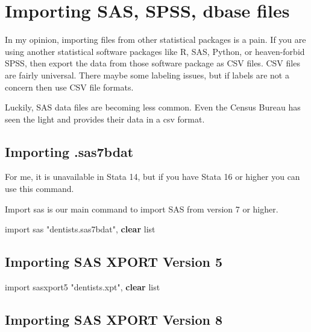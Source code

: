 \documentclass[
]{book}
\newenvironment{Shaded}{\begin{snugshade}}{\end{snugshade}}
\newcommand{\KeywordTok}[1]{\textcolor[rgb]{0.13,0.29,0.53}{\textbf{#1}}}
\newcommand{\NormalTok}[1]{#1}
\newcommand{\OtherTok}[1]{\textcolor[rgb]{0.56,0.35,0.01}{#1}}
\newcommand{\StringTok}[1]{\textcolor[rgb]{0.31,0.60,0.02}{#1}}
\begin{document}
\section{Importing SAS, SPSS, dbase files}\label{importing-sas-spss-dbase-files}

In my opinion, importing files from other statistical packages is a pain. If you are using another statistical software packages like R, SAS, Python, or heaven-forbid SPSS, then export the data from those software package as CSV files. CSV files are fairly universal. There maybe some labeling issues, but if labels are not a concern then use CSV file formats.

Luckily, SAS data files are becoming less common. Even the Census Bureau has seen the light and provides their data in a csv format.

\subsection{Importing .sas7bdat}\label{importing-.sas7bdat}

For me, it is unavailable in Stata 14, but if you have Stata 16 or higher you can use this command.

Import sas is our main command to import SAS from version 7 or higher.

\begin{Shaded}
\begin{Highlighting}[]
\NormalTok{import sas }\StringTok{"dentists.sas7bdat"}\NormalTok{, }\KeywordTok{clear}
\OtherTok{list}
\end{Highlighting}
\end{Shaded}

\subsection{Importing SAS XPORT Version 5}\label{importing-sas-xport-version-5}

\begin{Shaded}
\begin{Highlighting}[]
\NormalTok{import sasxport5 }\StringTok{"dentists.xpt"}\NormalTok{, }\KeywordTok{clear}
\OtherTok{list}
\end{Highlighting}
\end{Shaded}

\subsection{Importing SAS XPORT Version 8}\label{importing-sas-xport-version-8}
\end{document}
